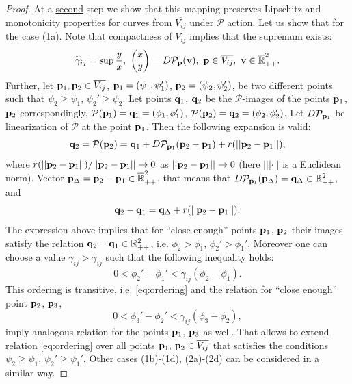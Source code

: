 \begin{proof}
	At a \underline{second} step we show that this mapping preserves Lipschitz and monotonicity properties for curves from $\overline{V_{ij}}$ under $\mathcal{P}$ action.
	Let us show that for the case (1a).
	Note that compactness of $\overline{V_{ij}}$ implies that the supremum exists:
	\begin{equation*}
		\widetilde{\gamma}_{ij} = \sup \dfrac{y}{x}, \ \begin{pmatrix} x \\ y \end{pmatrix} = D \mathcal{P}_{\vb{p}} (\mathbf{v}), \ \vb{p} \in \overline{V_{ij}}, \ \mathbf{v} \in \overline{\mathbb{R}}_{++}^2.
	\end{equation*}
	Further, let $\vb{p}_1, \vb{p}_2 \in \overline{V_{ij}}$, $\vb{p}_1 = (\psi_1, \psi_1')$, $\vb{p}_2 = (\psi_2, \psi_2')$, be two different points such that $\psi_2 \ge \psi_1$, $\psi_2' \ge \psi_2$.
	Let points $\vb{q}_1$, $\vb{q}_2$ be the $\mathcal{P}$-images of the points $\vb{p}_1$, $\vb{p}_2$ correspondingly, $\mathcal{P}(\vb{p}_1) = \vb{q}_1 = (\phi_1, \phi_1')$, $\mathcal{P}(\vb{p}_2) = \vb{q}_2 = (\phi_2, \phi_2')$.
	Let $D \mathcal{P}_{\vb{p}_1}$ be linearization of $\mathcal{P}$ at the point $\vb{p}_1$.
	Then the following expansion is valid:
	\begin{equation}
		\vb{q}_2 = \mathcal{P}(\vb{p}_2) = \vb{q}_1 + D \mathcal{P}_{\vb{p}_1} (\vb{p}_2 - \vb{p}_1) + r(||\vb{p}_2 - \vb{p}_1||),
	\end{equation}
	where $r(||\vb{p}_2 - \vb{p}_1||) / ||\vb{p}_2 - \vb{p}_1|| \to 0$ as $||\vb{p}_2 - \vb{p}_1|| \to 0$ (here $|||\cdot||$ is a Euclidean norm).
	Vector $\vb{p}_{\Delta} = \vb{p}_2 - \vb{p}_1 \in \overline{\mathbb{R}}_{++}^2$, that means that $D \mathcal{P}_{\vb{p}_1} (\mathbf{p}_{\Delta}) = \mathbf{q}_{\Delta} \in \mathbb{R}_{++}^2$, and
	\begin{equation}
		\vb{q}_2 - \vb{q}_1 = \mathbf{q}_{\Delta} + r(||\vb{p}_2 - \vb{p}_1||).
	\end{equation}
	The expression above implies that for ``close enough'' points $\vb{p}_1$, $\vb{p}_2$ their images satisfy the relation $\vb{q}_2 - \vb{q}_1 \in \mathbb{R}_{++}^2$, i.e. $\phi_2 > \phi_1$, $\phi_2' > \phi_1'$.
	Moreover one can choose a value $\gamma_{ij} > \widetilde{\gamma_{ij}}$ such that the following inequality holds:
	\begin{equation}
		0 < \phi_2' - \phi_1' < \gamma_{ij} (\phi_2 - \phi_1).
	\label{eq:ordering}
	\end{equation}
	This ordering is transitive, i.e. \eqref{eq:ordering} and the relation for ``close enough'' point $\vb{p}_2$, $\vb{p}_3$,
	\begin{equation}
		0 < \phi_3' - \phi_2' < \gamma_{ij} (\phi_3 - \phi_2),
	\end{equation}
	imply analogous relation for the points $\vb{p}_1$, $\vb{p}_3$ as well.
	That allows to extend relation \eqref{eq:ordering} over all points $\vb{p}_1, \, \vb{p}_2 \in \overline{V_{ij}}$ that satisfies the conditions $\psi_2 \ge \psi_1$, $\psi_2' \ge \psi_1'$.
	Other cases (1b)-(1d), (2a)-(2d) can be considered in a similar way.
	

\end{proof}

